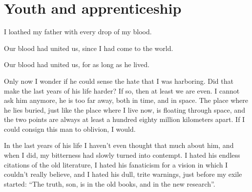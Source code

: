 \chapter{Youth and apprenticeship}

I loathed my father with every drop of my blood.

Our blood had united us, since I had come to the world.

Our blood had united us, for as long as he lived.

Only now I wonder if he could sense the hate that I was harboring.
Did that make the last years of his life harder? If so, then at least we are even. 
I cannot ask him anymore, he is too far away, both in time, and in space.
The place where he lies buried, just like the place where I live now, is floating through space, and the two points are always at least a hundred eighty million kilometers apart.
If I could consign this man to oblivion, I would. 

In the last years of his life I haven't even thought that much about him, and when I did, my bitterness had slowly turned into contempt.
I hated his endless citations of the old literature, I hated his fanaticism for a vision in which I couldn't really believe,
and I hated his dull, trite warnings, just before my exile started: ``The truth, son, is in the old books, and in the new research''.